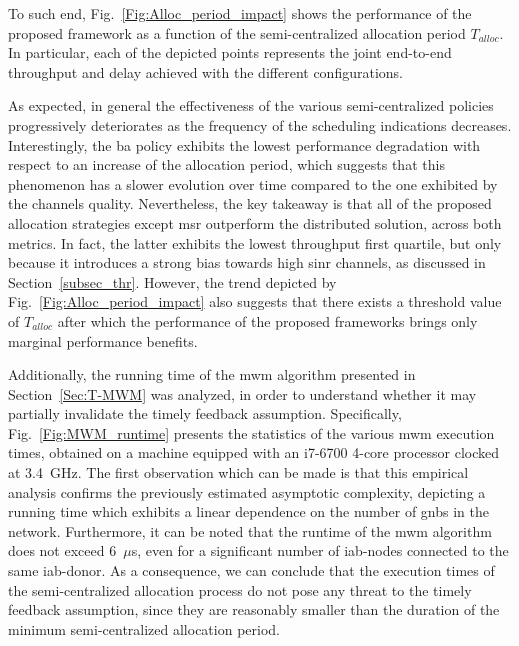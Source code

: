 To such end, Fig.~\ref{Fig:Alloc_period_impact} shows the performance of the proposed framework as a function of the semi-centralized allocation period $T_{alloc}$. In particular, each of the depicted points represents the joint end-to-end throughput and delay achieved with the different configurations.

As expected, in general the effectiveness of the various semi-centralized policies progressively deteriorates as the frequency of the scheduling indications decreases. Interestingly, the \gls{ba} policy exhibits the lowest performance degradation with respect to an increase of the allocation period, which suggests that this phenomenon has a slower evolution over time compared to the one exhibited by the channels quality. Nevertheless, the key takeaway is that all of the proposed allocation strategies except \gls{msr} outperform the distributed solution, across both metrics. In fact, the latter exhibits the lowest throughput first quartile, but only because it introduces a strong bias towards high \gls{sinr} channels, as discussed in Section~\ref{subsec_thr}. However, the trend depicted by Fig.~\ref{Fig:Alloc_period_impact} also suggests that there exists a threshold value of $T_{alloc}$ after which the performance of the proposed frameworks brings only marginal performance benefits.

Additionally, the running time of the \gls{mwm} algorithm presented in Section~\ref{Sec:T-MWM} was analyzed, in order to understand whether it may partially invalidate the timely feedback assumption. Specifically, Fig.~\ref{Fig:MWM_runtime} presents the statistics of the various \gls{mwm} execution times, obtained on a machine equipped with an i7-6700 4-core processor clocked at 3.4~{GHz}. 
The first observation which can be made is that this empirical analysis confirms the previously estimated asymptotic complexity, depicting a running time which exhibits a linear dependence on the number of \glspl{gnb} in the network. Furthermore, it can be noted that the runtime of the \gls{mwm} algorithm does not exceed 6~$\mu$s, even for a significant number of \gls{iab}-nodes connected to the same \gls{iab}-donor. As a consequence, we can conclude that the execution times of the semi-centralized allocation process do not pose any threat to the timely feedback assumption, since they are reasonably smaller than the duration of the minimum semi-centralized allocation period. 